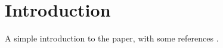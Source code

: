 \section{Introduction}

A simple introduction to the paper, with some references \cite{Shapley1988AVF}.
